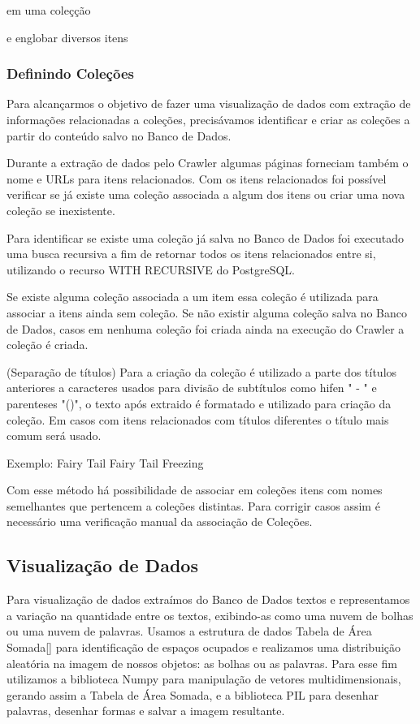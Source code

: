 \documentclass[12pt]{article}
\begin{document}
em uma coleçção


e englobar diversos itens






\subsubsection{Definindo Coleções}

Para alcançarmos o objetivo de fazer uma visualização de dados com extração de informações relacionadas a coleções, precisávamos identificar e criar as coleções a partir do conteúdo salvo no Banco de Dados.

Durante a extração de dados pelo Crawler algumas páginas forneciam também o nome e URLs para itens relacionados. Com os itens relacionados foi possível verificar se já existe uma coleção associada a algum dos itens ou criar uma nova coleção se inexistente.

Para identificar se existe uma coleção já salva no Banco de Dados foi executado uma busca recursiva a fim de retornar todos os itens relacionados entre si, utilizando o recurso WITH RECURSIVE do PostgreSQL.

Se existe alguma coleção associada a um item essa coleção é utilizada para associar a itens ainda sem coleção. Se não existir alguma coleção salva no Banco de Dados, casos em nenhuma coleção foi criada ainda na execução do Crawler a coleção é criada.

(Separação de títulos)
Para a criação da coleção é utilizado a parte dos títulos anteriores a caracteres usados para divisão de subtítulos como hifen " - " e parenteses "()", o texto após extraido é formatado e utilizado para criação da coleção. 
Em casos com itens relacionados com títulos diferentes o título mais comum será usado.  


Exemplo:
		Fairy Tail
		Fairy Tail Freezing

		

Com esse método há possibilidade de associar em coleções itens com nomes semelhantes que pertencem a coleções distintas. Para corrigir casos assim é necessário uma verificação manual da associação de Coleções.



\subsection{Visualização de Dados}

Para visualização de dados extraímos do Banco de Dados textos e representamos a variação na quantidade entre os textos, exibindo-as como uma nuvem de bolhas ou uma nuvem de palavras. 
Usamos a estrutura de dados Tabela de Área Somada[] para identificação de espaços ocupados e realizamos uma distribuição aleatória na imagem de nossos objetos: as bolhas ou as palavras.
Para esse fim utilizamos a biblioteca Numpy para manipulação de vetores multidimensionais, gerando assim a Tabela de Área Somada, e a biblioteca PIL para desenhar palavras, desenhar formas e salvar a imagem resultante.
\end{document}
